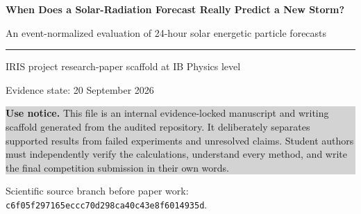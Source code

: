 \documentclass[11pt]{article}
\begin{document}
\begin{titlepage}
\centering
\vspace*{1.2cm}
{\color{navy}\Huge\bfseries When Does a Solar-Radiation Forecast Really Predict a New Storm?\par}
\vspace{0.35cm}
{\Large An event-normalized evaluation of 24-hour solar energetic particle forecasts\par}
\vspace{0.9cm}
\rule{0.82\textwidth}{0.8pt}\par
\vspace{0.8cm}
{\large IRIS project research-paper scaffold at IB Physics level\par}
\vspace{0.25cm}
{\large Evidence state: 20 September 2026\par}
\vfill
\begin{minipage}{0.90\textwidth}
\colorbox{lightgray}{\parbox{0.94\textwidth}{
\textbf{Use notice.} This file is an internal evidence-locked manuscript and writing scaffold generated from the audited repository. It deliberately separates supported results from failed experiments and unresolved claims. Student authors must independently verify the calculations, understand every method, and write the final competition submission in their own words.
}}
\end{minipage}
\vfill
{\small Scientific source branch before paper work: \texttt{c6f05f297165eccc70d298ca40c43e8f6014935d}.}
\end{titlepage}
\end{document}
